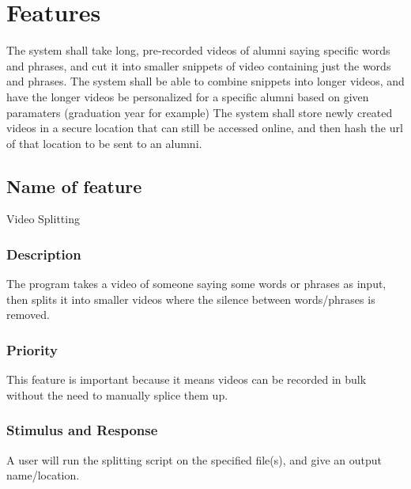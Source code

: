 \section{Features}

The system shall take long, pre-recorded videos of alumni saying specific words and phrases, and cut it into smaller snippets of video containing just the words and phrases.
The system shall be able to combine snippets into longer videos, and have the longer videos be personalized for a specific alumni based on given paramaters (graduation year for example)
The system shall store newly created videos in a secure location that can still be accessed online, and then hash the url of that location to be sent to an alumni.

\subsection{Name of feature}
Video Splitting
\subsubsection{Description}
The program takes a video of someone saying some words or phrases as input, then splits it into smaller videos where the silence between words/phrases is removed.

\subsubsection{Priority}
This feature is important because it means videos can be recorded in bulk without the need to manually splice them up.

\subsubsection{Stimulus and Response}
A user will run the splitting script on the specified file(s), and give an output name/location.

